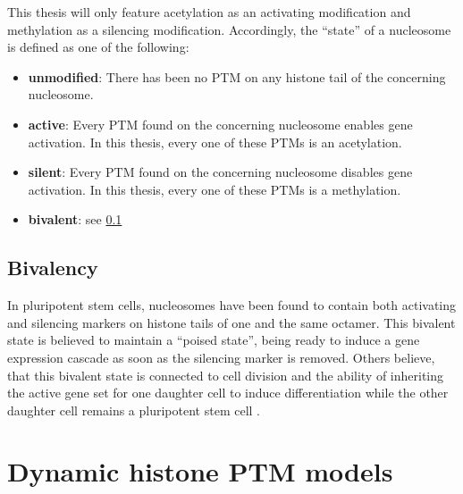             This thesis will only feature acetylation as an activating modification and methylation as a silencing modification. Accordingly, the “state” of a nucleosome is defined as one of the following:
            \begin{itemize}
                \item \textbf{unmodified}: There has been no PTM on any histone tail of the concerning nucleosome.
                \item \textbf{active}: Every PTM found on the concerning nucleosome enables gene activation. In this thesis, every one of these PTMs is an acetylation.
                \item \textbf{silent}: Every PTM found on the concerning nucleosome disables gene activation. In this thesis, every one of these PTMs is a methylation.
                \item \textbf{bivalent}: see \ref{sec:bivalency}
            \end{itemize}
        \subsection{Bivalency}
            \label{sec:bivalency}
            In pluripotent stem cells, nucleosomes have been found to contain both activating and silencing markers on histone tails of one and the same octamer. This bivalent state is believed to maintain a “poised state”, being ready to induce a gene expression cascade as soon as the silencing marker is removed. %
            Others believe, that this bivalent state is connected to cell division and the ability of inheriting the active gene set for one daughter cell to induce differentiation while the other daughter cell remains a pluripotent stem cell \cite{schuettengruber2017genome}. %
    \section{Dynamic histone PTM models}
